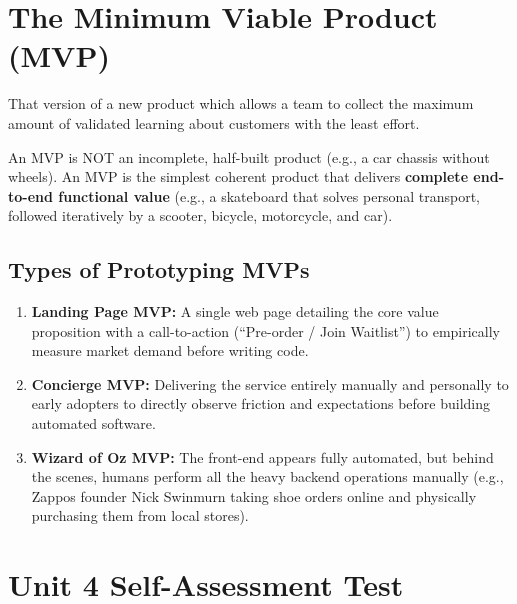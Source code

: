 \section{The Minimum Viable Product (MVP)}

\begin{definition}
That version of a new product which allows a team to collect the maximum amount of validated learning about customers with the least effort.
\end{definition}

\begin{keyequation}
An MVP is NOT an incomplete, half-built product (e.g., a car chassis without wheels). An MVP is the simplest coherent product that delivers \textbf{complete end-to-end functional value} (e.g., a skateboard that solves personal transport, followed iteratively by a scooter, bicycle, motorcycle, and car).
\end{keyequation}

\subsection{Types of Prototyping MVPs}
\begin{enumerate}[leftmargin=1.2em, itemsep=3pt]
    \item \textbf{Landing Page MVP:} A single web page detailing the core value proposition with a call-to-action (``Pre-order / Join Waitlist'') to empirically measure market demand before writing code.
    \item \textbf{Concierge MVP:} Delivering the service entirely manually and personally to early adopters to directly observe friction and expectations before building automated software.
    \item \textbf{Wizard of Oz MVP:} The front-end appears fully automated, but behind the scenes, humans perform all the heavy backend operations manually (e.g., Zappos founder Nick Swinmurn taking shoe orders online and physically purchasing them from local stores).
\end{enumerate}

\section{Unit 4 Self-Assessment Test}

